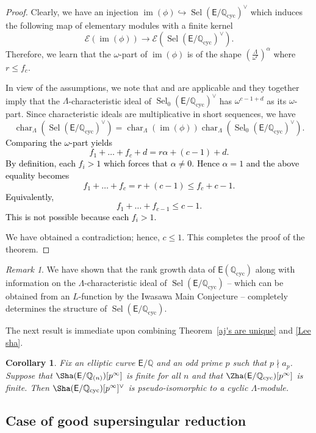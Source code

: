 \documentclass{amsart}
\newcommand{\edit}[1]{\textcolor{black}{#1}}
\newtheorem{corollary}[theorem]{Corollary}
\numberwithin{equation}{section}
\theoremstyle{remark}
\newtheorem{remark}[theorem]{Remark}
\newcommand{\EC}{\mathsf{E}}
\newcommand{\Q}{\mathbb{Q}}
\newcommand{\cyc}{\operatorname{{cyc}}}
\newcommand{\image}{\operatorname{im}}
\newcommand{\Sel}{\operatorname{Sel}}
\newcommand{\charac}{\operatorname{char}}
\theoremstyle{plain} %
\begin{document}
\begin{proof}
Clearly, we have an injection $\image(\phi) \hookrightarrow \Sel(\EC/\Q_{\cyc})^\vee$ which induces the following map of elementary modules with a finite kernel
\[
\mathscr{E}(\image(\phi)) \longrightarrow \mathscr{E}(\Sel(\EC/\Q_{\cyc})^\vee).
\]
Therefore, we learn that the $\omega$-part of $\image(\phi)$ is of the shape $\left(\frac{\Lambda}{\omega^r}\right)^{\alpha}$ where $r \leq f_c$.

In view of the assumptions, we note that \cite[Theorem~C]{Lei23} and \cite[Corollary~3.0.6]{Lee20} are applicable and they together imply that the $\Lambda$-characteristic ideal of $\Sel_0(\EC/\Q_{\cyc})^\vee$ has $\omega^{c-1+d}$ as its $\omega$-part.
Since characteristic ideals are multiplicative in short sequences, we have
\[
\charac_{\Lambda}(\Sel(\EC/\Q_{\cyc})^\vee) = \charac_{\Lambda}(\image(\phi))\charac_{\Lambda}(\Sel_0(\EC/\Q_{\cyc})^\vee).
\]
\edit{
Comparing the $\omega$-part yields
\[
f_1 + \ldots + f_c + d = r\alpha + (c-1) + d.
\]
By definition, each $f_i > 1$ which forces that $\alpha \neq 0$. Hence $\alpha=1$ and
the above equality becomes
\[
f_1 + \ldots + f_c = r + (c-1) \leq f_c + c-1.
\]
Equivalently,
\[
f_1 + \ldots + f_{c-1} \leq c-1.
\]
This is not possible because each $f_i > 1$.
}

We have obtained a contradiction; hence, $c\leq 1$.
This completes the proof of the theorem.
\end{proof}

\begin{remark}
We have shown that the rank growth data of $\EC(\Q_{\cyc})$ along with information on the $\Lambda$-characteristic ideal of $\Sel(\EC/\Q_{\cyc})$ -- which can be obtained from an $L$-function by the Iwasawa Main Conjecture -- completely determines the structure of $\Sel(\EC/\Q_{\cyc})$.
\end{remark}


The next result is immediate upon combining Theorem~\ref{aj's are unique} and \eqref{Lee sha}.

\begin{corollary}
Fix an elliptic curve $\EC/\Q$ and an odd prime $p$ such that $p\nmid a_p$.
Suppose that $\Sha(\EC/\Q_{(n)})[p^{\infty}]$ is finite for all $n$ and that $\Zha(\EC/\Q_{\cyc})[p^\infty]$ is finite.
Then $\Sha(\EC/\Q_{\cyc})[p^\infty]^\vee$ is pseudo-isomorphic to a cyclic $\Lambda$-module.
\end{corollary}


\subsection{Case of good supersingular reduction}
\end{document}

